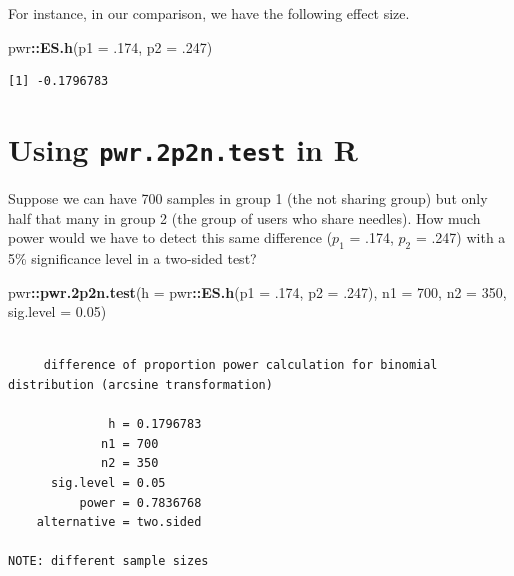\documentclass[
]{book}
\newenvironment{Shaded}{\begin{snugshade}}{\end{snugshade}}
\newcommand{\DataTypeTok}[1]{\textcolor[rgb]{0.13,0.29,0.53}{#1}}
\newcommand{\DecValTok}[1]{\textcolor[rgb]{0.00,0.00,0.81}{#1}}
\newcommand{\FloatTok}[1]{\textcolor[rgb]{0.00,0.00,0.81}{#1}}
\newcommand{\KeywordTok}[1]{\textcolor[rgb]{0.13,0.29,0.53}{\textbf{#1}}}
\newcommand{\NormalTok}[1]{#1}
\newcommand{\OperatorTok}[1]{\textcolor[rgb]{0.81,0.36,0.00}{\textbf{#1}}}
\begin{document}
For instance, in our comparison, we have the following effect size.

\begin{Shaded}
\begin{Highlighting}[]
\NormalTok{pwr}\OperatorTok{::}\KeywordTok{ES.h}\NormalTok{(}\DataTypeTok{p1 =} \FloatTok{.174}\NormalTok{, }\DataTypeTok{p2 =} \FloatTok{.247}\NormalTok{)}
\end{Highlighting}
\end{Shaded}

\begin{verbatim}
[1] -0.1796783
\end{verbatim}

\hypertarget{using-pwr.2p2n.test-in-r}{%
\section{\texorpdfstring{Using \texttt{pwr.2p2n.test} in R}{Using pwr.2p2n.test in R}}\label{using-pwr.2p2n.test-in-r}}

Suppose we can have 700 samples in group 1 (the not sharing group) but only half that many in group 2 (the group of users who share needles). How much power would we have to detect this same difference (\(p_1\) = .174, \(p_2\) = .247) with a 5\% significance level in a two-sided test?

\begin{Shaded}
\begin{Highlighting}[]
\NormalTok{pwr}\OperatorTok{::}\KeywordTok{pwr.2p2n.test}\NormalTok{(}\DataTypeTok{h =}\NormalTok{ pwr}\OperatorTok{::}\KeywordTok{ES.h}\NormalTok{(}\DataTypeTok{p1 =} \FloatTok{.174}\NormalTok{, }\DataTypeTok{p2 =} \FloatTok{.247}\NormalTok{), }
              \DataTypeTok{n1 =} \DecValTok{700}\NormalTok{, }\DataTypeTok{n2 =} \DecValTok{350}\NormalTok{,}
              \DataTypeTok{sig.level =} \FloatTok{0.05}\NormalTok{)}
\end{Highlighting}
\end{Shaded}

\begin{verbatim}

     difference of proportion power calculation for binomial distribution (arcsine transformation) 

              h = 0.1796783
             n1 = 700
             n2 = 350
      sig.level = 0.05
          power = 0.7836768
    alternative = two.sided

NOTE: different sample sizes
\end{verbatim}
\end{document}
